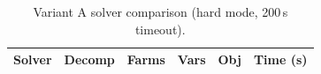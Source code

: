 \begin{table}[htbp]
\centering
\caption{Variant A solver comparison (hard mode, 200\,s timeout).}
\label{tab:variant_A_full}
\begin{tabular}{llrrrr}
\toprule
    \textbf{Solver} & \textbf{Decomp} & \textbf{Farms} & \textbf{Vars} & \textbf{Obj} & \textbf{Time (s)} \\ \midrule
\bottomrule
\end{tabular}

    \smallskip{}
\end{table}
